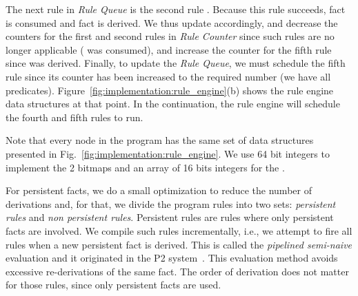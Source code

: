 The next rule in \emph{Rule Queue} is the second rule .  Because
this rule succeeds, fact  is consumed and fact  is derived.  We
thus update  accordingly, and decrease the counters for
the first and second rules in \emph{Rule Counter} since such rules are no longer
applicable ( was consumed), and increase the counter for the fifth rule
since  was derived. Finally, to update the \emph{Rule Queue}, we must
schedule the fifth rule since its counter has been increased to the required
number (we have all predicates).  Figure~\ref{fig:implementation:rule_engine}(b)
shows the rule engine data structures at that point.  In the continuation, the
rule engine will schedule the fourth and fifth rules to run.

Note that every node in the program has the same set of data structures
presented in Fig.~\ref{fig:implementation:rule_engine}. We use 64 bit integers
to implement the 2 bitmaps and an array of 16 bits integers for the .

For persistent facts, we do a small optimization to reduce the number of
derivations and, for that, we divide the program rules into two sets:
\emph{persistent rules} and \emph{non persistent rules}. Persistent rules are
rules where only persistent facts are involved. We compile such rules
incrementally, i.e., we attempt to fire all rules when a new persistent fact is
derived. This is called the \emph{pipelined semi-naive} evaluation and it
originated in the P2 system~\cite{Loo-condie-garofalakis-p2}. This evaluation
method avoids excessive re-derivations of the same fact. The order of derivation
does not matter for those rules, since only persistent facts are used.

